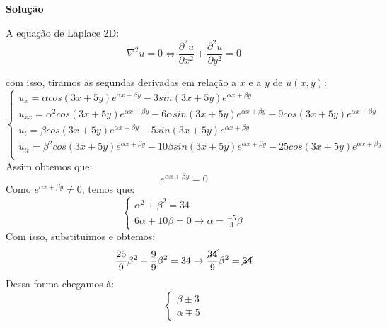 \linespread{1.5}

\textbf{Solução}

A equação de Laplace 2D:
\begin{equation*}
    \nabla^2u = 0 \Leftrightarrow \frac{\partial^2 u}{\partial x^2} +\frac{\partial^2 u}{\partial y^2} = 0
\end{equation*}

com isso, tiramos as segundas derivadas em relação a $x$ e a $y$ de $u(x,y)$:
\begin{equation*}
    \begin{cases}
        u_x = \alpha cos(3x+5y)e^{\alpha x+\beta y} - 3sin(3x+5y)e^{\alpha x+\beta y}\\
        u_{xx} = \alpha^2 cos(3x+5y)e^{\alpha x+\beta y} - 6\alpha sin(3x+5y)e^{\alpha x+\beta y} - 9cos(3x+5y)e^{\alpha x+\beta y}\\
        u_t = \beta cos(3x+5y)e^{\alpha x+\beta y} - 5sin(3x+5y)e^{\alpha x+\beta y}\\
        u_{tt} = \beta^2 cos(3x+5y)e^{\alpha x+\beta y} - 10\beta sin(3x+5y)e^{\alpha x+\beta y} - 25cos(3x+5y)e^{\alpha x+\beta y}\\
    \end{cases}
\end{equation*}
Assim obtemos que:
\begin{equation*}
    [(\alpha^2 + \beta^2 - 34)cos(3x+5y) - (6\alpha+10\beta sin(3x+5y)]e^{\alpha x+\beta y} = 0
\end{equation*}
Como $e^{\alpha x+\beta y} \neq 0$, temos que:
\begin{equation*}
    \begin{cases}
        \alpha^2+\beta^2=34\\
        6\alpha + 10\beta = 0 \rightarrow \alpha = \frac{-5}{3}\beta
    \end{cases}
\end{equation*}
Com isso, substituimos e obtemos:
\begin{equation*}
    \frac{25}{9}\beta^2 + \frac{9}{9}\beta^2 = 34 \rightarrow \frac{\cancel{34}}{9}\beta^2=\cancel{34}
\end{equation*}
Dessa forma chegamos à:
\begin{equation*}
    \begin{cases}
        \beta \pm 3\\
        \alpha \mp 5
    \end{cases}
\end{equation*}